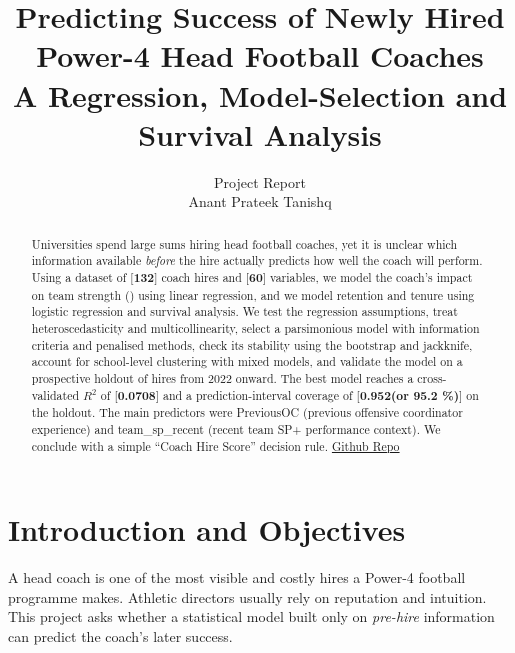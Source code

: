 \documentclass[11pt,a4paper]{article}
\title{\textbf{Predicting Success of Newly Hired Power-4 Head Football Coaches}\\[4pt]
\large A Regression, Model-Selection and Survival Analysis}
\author{Project Report\\[2pt] {Anant Prateek Tanishq}}
\date{}
\newcommand{\var}[1]{\texttt{\detokenize{#1}}}
\newcommand{\ph}[1]{\textcolor{red!70!black}{[\textbf{#1}]}}
\begin{document}
\maketitle
\thispagestyle{empty}

\begin{abstract}
Universities spend large sums hiring head football coaches, yet it is unclear which information available \emph{before} the hire actually predicts how well the coach will perform. Using a dataset of \ph{132} coach hires and \ph{60} variables, we model the coach's impact on team strength (\var{sp_rel_team}) using linear regression, and we model retention and tenure using logistic regression and survival analysis. We test the regression assumptions, treat heteroscedasticity and multicollinearity, select a parsimonious model with information criteria and penalised methods, check its stability using the bootstrap and jackknife, account for school-level clustering with mixed models, and validate the model on a prospective holdout of hires from 2022 onward. The best model reaches a cross-validated $R^2$ of \ph{0.0708} and a prediction-interval coverage of \ph{0.952(or 95.2 \%)} on the holdout. The main predictors were PreviousOC (previous offensive coordinator experience) and team\_sp\_recent (recent team SP+ performance context). We conclude with a simple ``Coach Hire Score'' decision rule. \href{https://github.com/avasterinbloom/Predicting-Success-of-Newly-Hired-Power-4-Head-Football-Coaches/upload/main}{Github Repo}
\end{abstract}

\section{Introduction and Objectives}
A head coach is one of the most visible and costly hires a Power-4 football programme makes. Athletic directors usually rely on reputation and intuition. This project asks whether a statistical model built only on \emph{pre-hire} information can predict the coach's later success.
\end{document}
